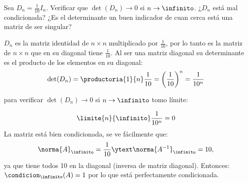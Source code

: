 \begin{enunciado}{\ejercicio}
  Sea $D_n = \frac{1}{10} I_n$. Verificar que $\det(D_n) \to 0$ si $n \to \infinito$. ¿$D_n$ está mal
  condicionada? ¿Es el determinante un buen indicador de cuan cerca está una matriz de ser
  singular?
\end{enunciado}

\medskip

$D_n$ es la matriz identidad de $n \times n$ multiplicado por $\frac{1}{10}$,
por lo tanto es la matriz de $n \times n$
que en su diagonal tiene $\frac{1}{10}$.
Al ser una matriz diagonal su determinante es el producto de los elementos en su diagonal:
$$
  \det(D_n) =
  \productoria{1}{n} \frac{1}{10} =
  \left(\frac{1}{10}\right)^n=
  \frac{1}{10^n}
$$

para verificar $\det(D_n) \to 0$ si $n \to \infinito$ tomo límite:

$$
  \limite{n}{\infinito}\frac{1}{10^n} = 0
$$
La matriz está bien condicionada, se ve fácilmente que:
$$
  \norma{A}_\infinito = \frac{1}{10} \ytext \norma{A^{-1}}_\infinito = 10,
$$
ya que tiene todos 10 en la diagonal (inversa de matriz diagonal). Entonces: $\condicion_\infinito(A) = 1$ por lo que está perfectamente condicionada.

\begin{aportes}
  \item {}
\end{aportes}

